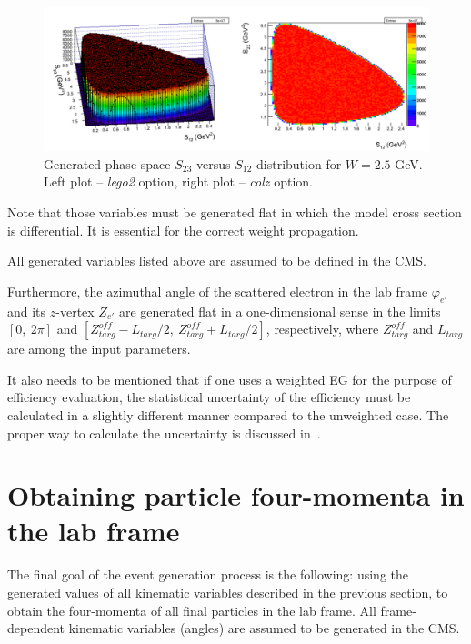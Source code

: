 \begin{figure}[htp]
\begin{center}
\includegraphics[width=16cm]{pictures/gen_proced/flat_s23_vs_s12.pdf}
\caption{\small Generated phase space $S_{23}$ versus $S_{12}$ distribution for  $W = 2.5$ GeV.  Left plot -- {\it lego2} option, right plot -- {\it  colz} option.  } \label{fig:s23_vs_s12_flat}
\end{center}
\end{figure}


Note that those variables must be generated flat in which the model cross section is differential. It is essential for the correct weight propagation.

All generated variables listed above are assumed to be defined in the CMS. 

Furthermore, the azimuthal angle of the scattered electron in the lab frame $\varphi_{e'}$ and its $z$-vertex $Z_{e'}$ are generated flat in a one-dimensional sense in the limits $[0,~2\pi]$ and $[Z^{off}_{targ}  - L_{targ}/2,~Z^{off}_{targ}  + L_{targ}/2]$, respectively, where $Z^{off}_{targ}$ and $L_{targ}$ are among the input parameters.

It also needs to be mentioned that if one uses a weighted EG for the purpose of efficiency evaluation, the statistical uncertainty of the efficiency must be calculated in a slightly different manner compared to the unweighted case. The proper way to calculate the uncertainty is discussed in~\cite{Laforge:1996ts}. 


\section{Obtaining particle four-momenta in the lab frame}
\label{sect:cms_to_lab_trans}

The final goal of the event generation process is the following: using the generated values of all kinematic variables described in the previous section, to obtain the four-momenta of all final particles in the lab frame. All frame-dependent kinematic variables (angles) are assumed to be generated in the CMS.

